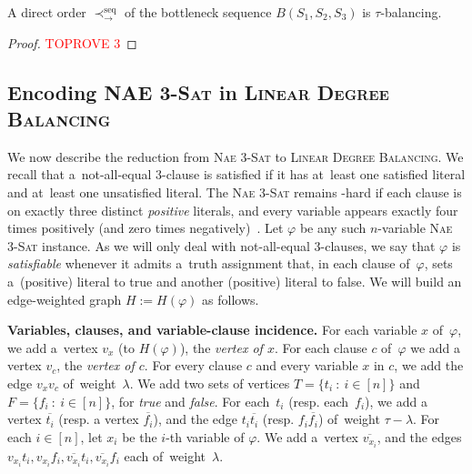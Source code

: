 \documentclass[a4paper,UKenglish,cleveref,hyperref,autoref]{lipics-v2021}
\newcommand{\ldb}{\textsc{Linear Degree Balancing}\xspace}
\begin{document}
\begin{lemma}\label{lem:direct-order}
A direct order $\prec^\text{seq}_{\rightarrow}$ of the bottleneck sequence $B(S_1, S_2, S_3)$ is $\tau$-balancing.
\end{lemma}
\begin{proof}\textcolor{red}{TOPROVE 3}\end{proof}

\subsection{Encoding \textsc{NAE 3-Sat} in \ldb}

We now describe the reduction from \textsc{Nae 3-Sat} to \ldb.
We recall that a~not-all-equal 3-clause is satisfied if it has at~least one satisfied literal and at~least one unsatisfied literal.
The \textsc{Nae 3-Sat} remains \NP-hard if each clause is on exactly three distinct \emph{positive} literals, and every variable appears exactly four times positively (and zero times negatively)~\cite{Darmann20}.
Let $\varphi$ be any such $n$-variable \textsc{Nae 3-Sat} instance.
As we will only deal with not-all-equal 3-clauses, we say that $\varphi$ is \emph{satisfiable} whenever it admits a~truth assignment that, in each clause of~$\varphi$, sets a~(positive) literal to true and another (positive) literal to false. 
We will build an edge-weighted graph $H := H(\varphi)$ as follows.


\medskip

\textbf{Variables, clauses, and variable-clause incidence.}
For each variable $x$ of~$\varphi$, we add a~vertex $v_x$ (to $H(\varphi)$), the \emph{vertex of $x$}.
For each clause $c$ of~$\varphi$ we add a vertex $v_c$, the \emph{vertex of $c$}.
For every clause $c$ and every variable $x$ in $c$, we add the edge $v_xv_c$ of~weight~$\lambda$.
We add two sets of vertices $T = \{t_i \ : \ i \in [n]\}$ and $F = \{f_i \ : \ i \in [n]\}$, for \emph{true} and \emph{false}.
For each~$t_i$ (resp. each~$f_i$), we add a vertex $\overline{t_i}$ (resp. a vertex $\overline{f_i}$), and the edge $t_i \overline{t_i}$ (resp. $f_i \overline{f_i}$) of~weight $\tau - \lambda$.
For each $i \in [n]$, let $x_i$ be the $i$-th variable of $\varphi$.
We add a~vertex $\overline{v_{x_i}}$, and the edges $v_{x_i}t_i, v_{x_i}f_i, \overline{v_{x_i}}t_i, \overline{v_{x_i}}f_i$ each of~weight~$\lambda$.
\end{document}
